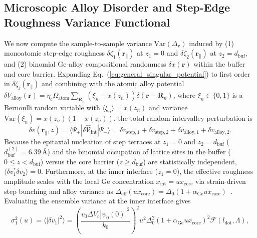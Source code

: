 \documentclass[11pt,letterpaper]{article}
\theoremstyle{definition}
\begin{document}
\subsection{Microscopic Alloy Disorder and Step-Edge Roughness Variance Functional}

We now compute the sample-to-sample variance $\mathrm{Var}(\Delta_{\mathrm{v}})$ induced by (1) monoatomic step-edge roughness $\delta\zeta_1(\mathbf{r}_\parallel)$ at $z_1 = 0$ and $\delta\zeta_2(\mathbf{r}_\parallel)$ at $z_2 = d_{\mathrm{buf}}$, and (2) binomial Ge-alloy compositional randomness $\delta x(\mathbf{r})$ within the buffer and core barrier. Expanding Eq.~(\ref{eq:general_singular_potential}) to first order in $\delta\zeta_j(\mathbf{r}_\parallel)$ and combining with the atomic alloy potential $\delta V_{\mathrm{alloy}}(\mathbf{r}) = \eta_{\mathrm{c}}\Omega_{\mathrm{atom}}\sum_{\mathbf{R}_n} (\xi_n - x(z_n))\delta(\mathbf{r} - \mathbf{R}_n)$, where $\xi_n \in \{0,1\}$ is a Bernoulli random variable with $\langle\xi_n\rangle = x(z_n)$ and variance $\mathrm{Var}(\xi_n) = x(z_n)(1 - x(z_n))$, the total random intervalley perturbation is
\begin{equation}
  \delta v(\mathbf{r}_\parallel, z) = \langle \Psi_+ | \delta\hat{\mathcal{V}}_{\mathrm{int}} | \Psi_- \rangle = \delta v_{\mathrm{step},1} + \delta v_{\mathrm{step},2} + \delta v_{\mathrm{alloy},1} + \delta v_{\mathrm{alloy},2}.
  \label{eq:appA_delta_v_decomp}
\end{equation}
Because the epitaxial nucleation of step terraces at $z_1 = 0$ and $z_2 = d_{\mathrm{buf}}$ ($d_{\mathrm{buf}}^{(2)} = 6.39\,\text{\AA}$) and the binomial occupation of lattice sites in the buffer ($0 \le z < d_{\mathrm{buf}}$) versus the core barrier ($z \ge d_{\mathrm{buf}}$) are statistically independent, $\langle \delta v_1^* \delta v_2 \rangle = 0$. Furthermore, at the inner interface ($z_1 = 0$), the effective roughness amplitude scales with the local Ge concentration $x_{\mathrm{int}} = u x_{\mathrm{core}}$ via strain-driven step bunching and alloy variance as $\Delta_{\mathrm{eff}}(u x_{\mathrm{core}}) = \Delta_0 (1 + \alpha_{\mathrm{Ge}} u x_{\mathrm{core}})$~\cite{Losert2023}. Evaluating the ensemble variance at the inner interface gives
\begin{equation}
  \sigma_1^2(u) = \langle |\delta v_1|^2 \rangle = \left(\frac{v_0 \Delta V_{\mathrm{c}} |\psi_0(0)|^2}{k_0}\right)^2 u^2 \Delta_0^2 (1 + \alpha_{\mathrm{Ge}} u x_{\mathrm{core}})^2 \mathcal{F}(l_{\mathrm{dot}}, \Lambda),
  \label{eq:appA_sigma1_sq}
\end{equation}
\end{document}
